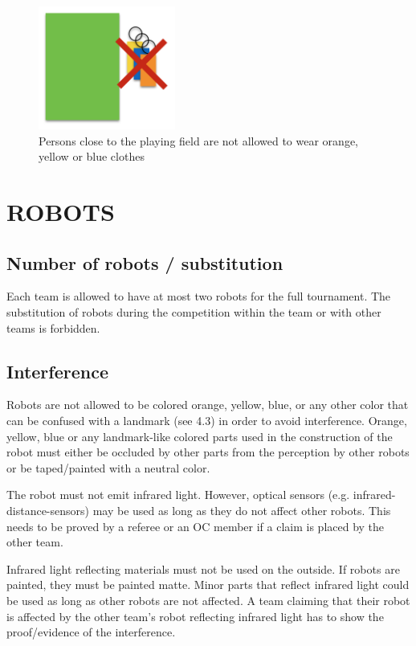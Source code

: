 \documentclass{article}
\begin{document}
\begin{figure}[H]
    \centering
    \includegraphics[width=0.4\textwidth]{media/image2.png}
    \caption{Persons close to the playing field are not allowed to wear orange,
        yellow or blue clothes}
    \label{fig:spectators}
\end{figure}


\section{ROBOTS\label{ref-018}}

\subsection{ Number of robots / substitution \label{ref-019}}

Each team is allowed to have at most two robots for the full tournament. The substitution of robots during the competition within the team or with other teams is forbidden.

\subsection{ Interference \label{ref-020}}

Robots are not allowed to be colored orange, yellow, blue, or any other color that can be confused with a landmark (see 4.3) in order to avoid interference. Orange, yellow, blue or any landmark-like colored parts used in the construction of the robot must either be occluded by other parts from the perception by other robots or be taped/painted with a neutral color.

The robot must not emit infrared light. However, optical sensors (e.g. infrared-distance-sensors) may be used as long as they do not affect other robots. This needs to be proved by a referee or an OC member if a claim is placed by the other team.

Infrared light reflecting materials must not be used on the outside. If robots are painted, they must be painted matte. Minor parts that reflect infrared light could be used as long as other robots are not affected. A team claiming that their robot is affected by the other team's robot reflecting infrared light has to show the proof/evidence of the interference.
\end{document}
